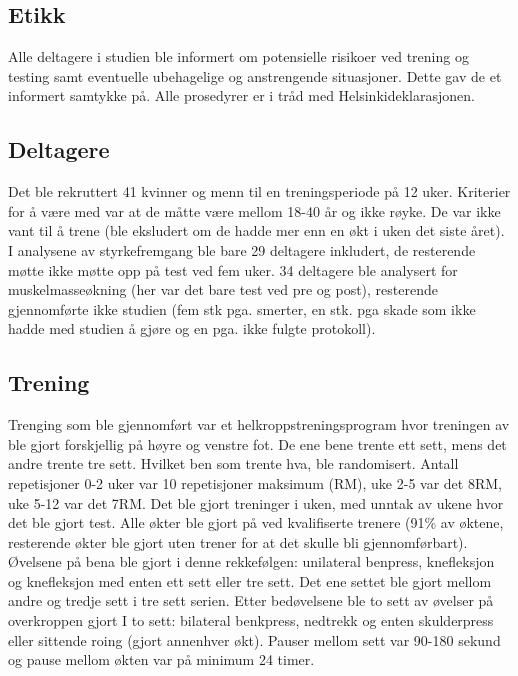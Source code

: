 \documentclass[
]{book}
\begin{document}
\hypertarget{etikk}{%
\subsection{Etikk}\label{etikk}}

Alle deltagere i studien ble informert om potensielle risikoer ved trening og testing samt eventuelle ubehagelige og anstrengende situasjoner. Dette gav de et informert samtykke på. Alle prosedyrer er i tråd med Helsinkideklarasjonen.

\hypertarget{deltagere}{%
\subsection{Deltagere}\label{deltagere}}

Det ble rekruttert 41 kvinner og menn til en treningsperiode på 12 uker. Kriterier for å være med var at de måtte være mellom 18-40 år og ikke røyke. De var ikke vant til å trene (ble eksludert om de hadde mer enn en økt i uken det siste året). I analysene av styrkefremgang ble bare 29 deltagere inkludert, de resterende møtte ikke møtte opp på test ved fem uker. 34 deltagere ble analysert for muskelmasseøkning (her var det bare test ved pre og post), resterende gjennomførte ikke studien (fem stk pga. smerter, en stk. pga skade som ikke hadde med studien å gjøre og en pga. ikke fulgte protokoll).

\hypertarget{trening}{%
\subsection{Trening}\label{trening}}

Trenging som ble gjennomført var et helkroppstreningsprogram hvor treningen av ble gjort forskjellig på høyre og venstre fot. De ene bene trente ett sett, mens det andre trente tre sett. Hvilket ben som trente hva, ble randomisert. Antall repetisjoner 0-2 uker var 10 repetisjoner maksimum (RM), uke 2-5 var det 8RM, uke 5-12 var det 7RM. Det ble gjort treninger i uken, med unntak av ukene hvor det ble gjort test. Alle økter ble gjort på ved kvalifiserte trenere (91\% av øktene, resterende økter ble gjort uten trener for at det skulle bli gjennomførbart). Øvelsene på bena ble gjort i denne rekkefølgen: unilateral benpress, knefleksjon og knefleksjon med enten ett sett eller tre sett. Det ene settet ble gjort mellom andre og tredje sett i tre sett serien. Etter bedøvelsene ble to sett av øvelser på overkroppen gjort I to sett: bilateral benkpress, nedtrekk og enten skulderpress eller sittende roing (gjort annenhver økt). Pauser mellom sett var 90-180 sekund og pause mellom økten var på minimum 24 timer.
\end{document}
